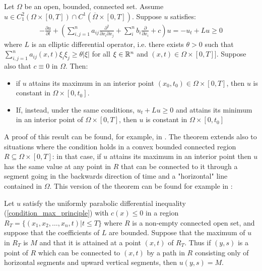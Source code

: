 \begin{theorem}\label{maximum_principle}
	Let $\Omega$ be an open, bounded, connected set. Assume $u\in C^2_1(\Omega\times [0, T])\cap C^1(\overline{\Omega}\times [0, T])$. Suppose $u$ satisfies: 
	\begin{align}
		-\frac{\partial u}{\partial t} + \left(\sum_{i, j=1}^n a_{ij}\frac{\partial^2 }{\partial x_i\partial x_j}+\sum_{i}^n b_{i}\frac{\partial }{\partial x_i} + c\right)  u = -u_t + Lu \geq 0 \label{condition_max_principle}
	\end{align}
	where $L$ is an elliptic differential operator, i.e. there exists $\theta>0$ such that $\sum_{i,j=1}^{n} a_{ij}(x, t) \xi_i\xi_j \geq \theta |\xi |$ for all $\xi \in \mathbb{R}^n$ and $(x, t) \in \Omega\times[0, T]]$. Suppose also that $c\equiv 0$ in $\Omega$. Then: \begin{itemize}
		\item if $u$ attains its maximum in an interior point $(x_0, t_0)\in\Omega\times [0, T]$, then $u$ is constant in $\Omega\times [0, t_0]$.
		\item If, instead, under the same conditions, $u_t+ Lu \geq 0$ and attains its minimum in an interior point of $\Omega\times [0, T]$, then $u$ is constant in $\Omega\times [0, t_0]$
	\end{itemize}
\end{theorem}
A proof of this result can be found, for example, in \cite{Evans}. The theorem extends also to situations where the condition holds in a convex bounded connected region $R\subseteq \Omega \times [0, T]$: in that case, if $u$ attains its maximum in an interior point then $u$ has the same value at any point in $R$ that can be connected to it through a segment going in the backwards direction of time and a "horizontal" line contained in $\Omega$. This version of the theorem can be found for example in \cite{protterweinberger}: 
\begin{theorem}
	Let $u$ satisfy the uniformly parabolic differential inequality (\ref{condition_max_principle}) with $c(x)\leq 0$
	in a region $R_T =\{(x_1,x_2, \dots ,x_n ,t)\vert t\leq T\}$ where $R$ is a non-empty connected open set, and suppose that the coefficients of $L$ are bounded. Suppose that the maximum of $u$ in $R_T$ is $M$ and that it is attained at a point $(x, t)$ of $R_T$. Thus if $(y,s)$ is a point of $R$ which can be connected to $(x,t)$ by a path in $R$ consisting only of horizontal segments and upward vertical segments, then $u(y,s) = M$.\label{maxprincprotterweinberger}
\end{theorem}

